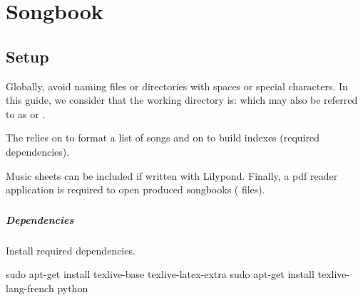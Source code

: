 \chapter{Songbook}
\setcounter{chapter}{1}
\label{chap:songbook}
\minitoc
{}


\section{Setup}
\label{sec:install}

Globally, avoid naming files or directories with spaces or special
characters. In this guide, we consider that the working directory is:
 which may also be referred to as
 or .

The \songbook relies on \latex to format a list of songs and on
\python to build indexes (required dependencies). 

Music sheets can be included if written with Lilypond.  Finally, a pdf
reader application is required to open produced songbooks (
files).

\subsection{\linux}

\paragraph{Dependencies}

Install required dependencies.
\begin{unix}
  sudo apt-get install texlive-base texlive-latex-extra
  sudo apt-get install texlive-lang-french python
\end{unix}

